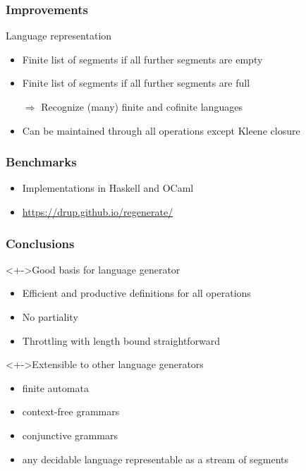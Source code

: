 \documentclass[pdftex]{beamer}
\begin{document}
\begin{frame}
  \frametitle{Improvements}
  \begin{block}{Language representation}
  \begin{itemize}
  \item Finite list of segments if all further segments are empty
  \item Finite list of segments if all further segments are full
  \item[$\Rightarrow$] Recognize (many) finite and cofinite languages
  \item Can be maintained through all operations except Kleene closure
  \end{itemize}
\end{block}
\end{frame}
\begin{frame}
  \frametitle{Benchmarks}
    \begin{itemize}
    \item Implementations in Haskell and OCaml
    \item \url{https://drup.github.io/regenerate/}
    \end{itemize}
\end{frame}
\begin{frame}
  \frametitle{Conclusions}
  \begin{block}<+->{Good basis for language generator}
    \begin{itemize}
    \item Efficient and productive definitions for all operations
    \item No partiality
    \item Throttling with length bound straightforward
    \end{itemize}
  \end{block}
  \begin{block}<+->{Extensible to other language generators}
    \begin{itemize}
    \item finite automata
    \item context-free grammars
    \item conjunctive grammars
    \item any decidable language representable as a stream of segments 
    \end{itemize}
  \end{block}
\end{frame}
\end{document}
